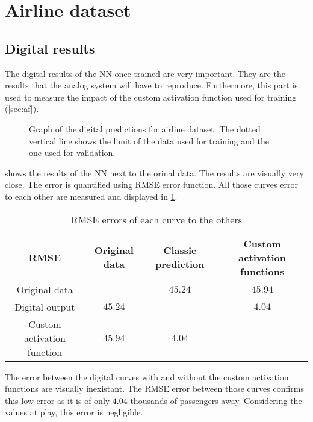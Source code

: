 \section{Airline dataset}
\label{sec:resAirline}

\subsection{Digital results}
\label{subsec:digitalAirline}

The digital results of the \ac{NN} once trained are very important. They are the results that the analog system will have to reproduce. Furthermore, this part is used to measure the impact of the custom activation function used for training (\cref{sec:af}).

\begin{figure}[H]
  \centering
  
  \caption{Graph of the digital predictions for airline dataset. The dotted vertical line shows the limit of the data used for training and the one used for validation.}
  \label{graph:airlineDigital}
\end{figure}

 shows the results of the \ac{NN} next to the orinal data. The results are visually very close. The error is quantified using \ac{RMSE} error function. All those curves error to each other are measured and displayed in \cref{tab:airlineDigital}.

\begin{table}[H]
  \centering
  \begin{tabular}{|c|c|c|c|}
    \hline
    \cellcolor[HTML]{808080}\acs{RMSE} & Original data & Classic prediction & Custom activation functions\\
    \hline
    Original data &\cellcolor[HTML]{202020} & $45.24$ & $45.94$\\
    \hline
    Digital output & $45.24$ & \cellcolor[HTML]{202020} & $4.04$\\
    \hline
    Custom activation function & $45.94$ & $4.04$ & \cellcolor[HTML]{202020}\\
    \hline
  \end{tabular}
  \caption{\ac{RMSE} errors of each curve to the others}
  \label{tab:airlineDigital}
\end{table}

The error between the digital curves with and without the custom activation functions are visually inexistant. The \ac{RMSE} error between those curves confirms this low error as it is of only $4.04$ thousands of passengers away. Considering the values at play, this error is negligible.

